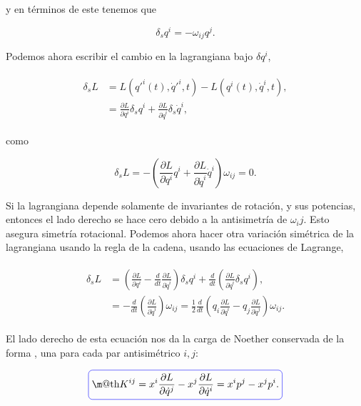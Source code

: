 \documentclass[a4paper,10pt]{article}
\makeatletter
\numberwithin{equation}{section}
\newcommand*{\boxcolor}{blue}
\renewcommand{\boxed}[1]{\textcolor{\boxcolor}{%
\tikz[baseline={([yshift=-1ex]current bounding box.center)}] \node [rectangle, minimum width=1ex,rounded corners,draw] {\normalcolor\m@th$\displaystyle#1$};}}
\makeatother
\begin{document}
y en términos de este tenemos que

\begin{equation}
 \delta_s q^i = -\omega_{ij}q^j.
\end{equation}
 
Podemos ahora escribir el cambio en la lagrangiana bajo $\delta q^i$,

\begin{align}
\begin{split}
 \delta_s L &= L(q'^i(t),\dot{q}'^i,t) - L(q^i(t),\dot{q}^i,t), \\
	    &= \frac{\partial L}{\partial q^i}\delta_s q^i + \frac{\partial L}{\partial \dot{q}^i}\delta_s \dot{q}^i,
 \end{split}
\end{align}

como

\begin{equation}
 \delta_s L = - \left(\frac{\partial L}{\partial q^i}q^i +  
  \frac{\partial L}{\partial \dot{q}^i}\dot{q}^i\right)\omega_{ij} = 0.
\end{equation}

Si la lagrangiana depende solamente de invariantes de rotación, y sus potencias, entonces 
el lado derecho se hace cero debido a la antisimetría de $\omega_ij$. Esto asegura 
simetría rotacional. Podemos ahora hacer otra variación simétrica de la lagrangiana 
usando la regla de la cadena, usando las ecuaciones de Lagrange, 

\begin{align}
 \begin{split}
  \delta_s L &= \left( \frac{\partial L}{\partial q^i} - \frac{d}{dt} \frac{\partial L}{\partial \dot{q}^i} 
  \right)\delta_s q^i + \frac{d}{dt}\left( \frac{\partial L}{\partial \dot{q}^i}\delta_s q^i \right), \\
	   &= -\frac{d}{dt}\left( \frac{\partial L}{\partial \dot{q}^i} \right)\omega_{ij} 
	   = \frac{1}{2}\frac{d}{dt}\left(q_i  \frac{\partial L}{\partial \dot{q}^i}  
	   -  q_j\frac{\partial L}{\partial \dot{q}^j}\right)\omega_{ij}.
 \end{split}
\end{align}

El lado derecho de esta ecuación nos da la carga de Noether conservada de la forma 
, una para cada par antisimétrico $i,j$:

\begin{equation}
 \boxed{K^{ij} = x^i\frac{\partial L}{\partial \dot{q}^j} - x^j\frac{\partial L}{\partial \dot{q}^i} 
 = x^i p^j - x^j p^i.}
\end{equation}
\end{document}
